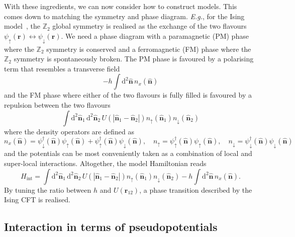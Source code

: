 \documentclass{timesjhep}
\begin{document}
With these ingredients, we can now consider how to construct models. This comes down to matching the symmetry and phase diagram. \textit{E.g.}, for the Ising model~\cite{Zhu2022}, the $\mathbb{Z}_2$ global symmetry is realised as the exchange of the two flavours $\psi_\uparrow(\mathbf{r})\leftrightarrow\psi_\downarrow(\mathbf{r})$. We need a phase diagram with a paramagnetic (PM) phase where the $\mathbb{Z}_2$ symmetry is conserved and a ferromagnetic (FM) phase where the $\mathbb{Z}_2$ symmetry is spontaneously broken. The PM phase is favoured by a polarising term that resembles a transverse field
\begin{equation*}
    -h\int\mathrm{d}^2\hat{\mathbf{n}}\,n_x(\hat{\mathbf{n}})
\end{equation*}
and the FM phase where either of the two flavours is fully filled is favoured by a repulsion between the two flavours 
\begin{equation*}
    \int\mathrm{d}^2\hat{\mathbf{n}}_1\,\mathrm{d}^2\hat{\mathbf{n}}_2\,U(|\hat{\mathbf{n}}_1-\hat{\mathbf{n}}_2|)n_\uparrow(\hat{\mathbf{n}}_1)n_\downarrow(\hat{\mathbf{n}}_2) 
\end{equation*} 
where the density operators are defined as 
\begin{equation*}
    n_x(\hat{\mathbf{n}})=\psi^\dagger_\downarrow(\hat{\mathbf{n}})\psi_\uparrow(\hat{\mathbf{n}})+\psi^\dagger_\uparrow(\hat{\mathbf{n}})\psi_\downarrow(\hat{\mathbf{n}}),\quad n_\uparrow=\psi^\dagger_\uparrow(\hat{\mathbf{n}})\psi_\uparrow(\hat{\mathbf{n}}),\quad n_\downarrow=\psi^\dagger_\downarrow(\hat{\mathbf{n}})\psi_\downarrow(\hat{\mathbf{n}}) 
\end{equation*}
and the potentials can be most conveniently taken as a combination of local and super-local interactions. Altogether, the model Hamiltonian reads 
\begin{equation}
    H_\mathrm{int}=\int\mathrm{d}^2\hat{\mathbf{n}}_1\,\mathrm{d}^2\hat{\mathbf{n}}_2\,U(|\hat{\mathbf{n}}_1-\hat{\mathbf{n}}_2|)n_\uparrow(\hat{\mathbf{n}}_1)n_\downarrow(\hat{\mathbf{n}}_2)-h\int\mathrm{d}^2\hat{\mathbf{n}}\,n_x(\hat{\mathbf{n}}).
    \label{eq:ising_hmt}
\end{equation}
By tuning the ratio between $h$ and $U(\mathbf{r}_{12})$, a phase transition described by the Ising CFT is realised. 

\subsection{Interaction in terms of pseudopotentials}
\label{sec:construct_pspot}
\end{document}
